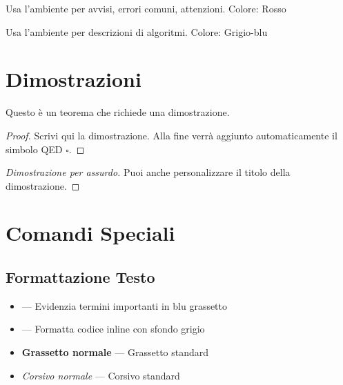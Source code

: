 \documentclass{csnotes}
\begin{document}
\begin{warning}
Usa l'ambiente  per avvisi, errori comuni, attenzioni.
Colore: Rosso
\end{warning}

\begin{algorithmdesc}
Usa l'ambiente  per descrizioni di algoritmi.
Colore: Grigio-blu
\end{algorithmdesc}


\section{Dimostrazioni}

\begin{theorem}
Questo è un teorema che richiede una dimostrazione.
\end{theorem}

\begin{proof}
Scrivi qui la dimostrazione. Alla fine verrà aggiunto automaticamente
il simbolo QED \(\square\).
\end{proof}

\begin{proof}[Dimostrazione per assurdo]
Puoi anche personalizzare il titolo della dimostrazione.
\end{proof}


\section{Comandi Speciali}

\subsection{Formattazione Testo}

\begin{itemize}
    \item {} --- Evidenzia termini importanti in blu grassetto
    \item {} --- Formatta codice inline con sfondo grigio
    \item \textbf{Grassetto normale} --- Grassetto standard
    \item \textit{Corsivo normale} --- Corsivo standard
\end{itemize}
\end{document}
